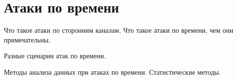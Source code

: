 \section{Атаки по времени}

Что такое атаки по сторонним каналам. Что такое атаки по времени, чем они примечательны.

Разные сценарии атак по времени. \cite{kek}

Методы анализа данных при атаках по времени. Статистические методы.

\clearpage
